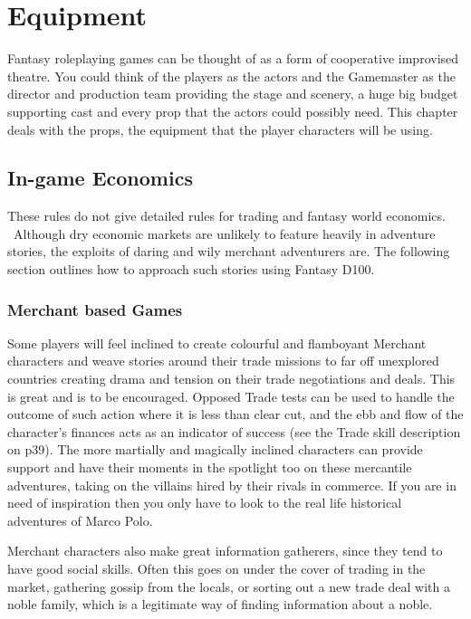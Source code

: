 \chapter{Equipment}
\label{ch:equipment}

Fantasy roleplaying games can be thought of as a form of cooperative improvised theatre. You could think of the players as the actors and the Gamemaster as the director and production team providing the stage and scenery, a huge big budget supporting cast and every prop that the actors could possibly need. This chapter deals with the props, the equipment that the player characters will be using.

\section{In-game Economics}
These rules do not give detailed rules for trading and fantasy world economics.  Although dry economic markets are unlikely to feature heavily in adventure stories, the exploits of daring and wily merchant adventurers are. The following section outlines how to approach such stories using Fantasy D100.

\subsection{Merchant based Games}
Some players will feel inclined to create colourful and flamboyant Merchant characters and weave stories around their trade missions to far off unexplored countries creating drama and tension on their trade negotiations and deals. This is great and is to be encouraged. Opposed Trade tests can be used to handle the outcome of such action where it is less than clear cut, and the ebb and flow of the character’s finances acts as an indicator of success (see the Trade skill description on p39). The more martially and magically inclined characters can provide support and have their moments in the spotlight too on these mercantile adventures, taking on the villains hired by their rivals in commerce. If you are in need of inspiration then you only have to look to the real life historical adventures of Marco Polo.

Merchant characters also make great information gatherers, since they tend to have good social skills. Often this goes on under the cover of trading in the market, gathering gossip from the locals, or sorting out a new trade deal with a noble family, which is a legitimate way of finding information about a noble.


